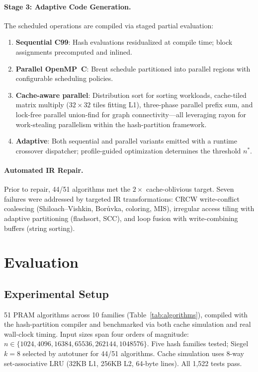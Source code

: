 \documentclass[11pt]{article}
\begin{document}
\paragraph{Stage 3: Adaptive Code Generation.}
The scheduled operations are compiled via staged partial evaluation:
\begin{enumerate}
\item \textbf{Sequential C99}: Hash evaluations residualized at compile
  time; block assignments precomputed and inlined.
\item \textbf{Parallel OpenMP~C}: Brent schedule partitioned into
  parallel regions with configurable scheduling policies.
\item \textbf{Cache-aware parallel}: Distribution sort for sorting
  workloads, cache-tiled matrix multiply ($32 \times 32$ tiles fitting
  L1), three-phase parallel prefix sum, and lock-free parallel
  union-find for graph connectivity---all leveraging rayon for
  work-stealing parallelism within the hash-partition framework.
\item \textbf{Adaptive}: Both sequential and parallel variants emitted
  with a runtime crossover dispatcher; profile-guided optimization
  determines the threshold $n^*$.
\end{enumerate}

\paragraph{Automated IR Repair.}
Prior to repair, 44/51 algorithms met the $2\times$ cache-oblivious
target.  Seven failures were addressed by targeted IR transformations:
CRCW write-conflict coalescing (Shiloach--Vishkin, Bor\r{u}vka,
coloring, MIS), irregular access tiling with adaptive partitioning
(flashsort, SCC), and loop fusion with write-combining buffers
(string sorting).

\section{Evaluation}
\label{sec:evaluation}

\subsection{Experimental Setup}

51 PRAM algorithms across 10 families (Table~\ref{tab:algorithms}),
compiled with the hash-partition compiler and benchmarked via both cache
simulation and real wall-clock timing.  Input sizes span four orders of
magnitude: $n \in \{1024, 4096, 16384, 65536, 262144, 1048576\}$.
Five hash families tested; Siegel $k = 8$ selected by autotuner for
44/51 algorithms.  Cache simulation uses 8-way set-associative LRU
(32KB L1, 256KB L2, 64-byte lines).  All 1,522 tests pass.
\end{document}
